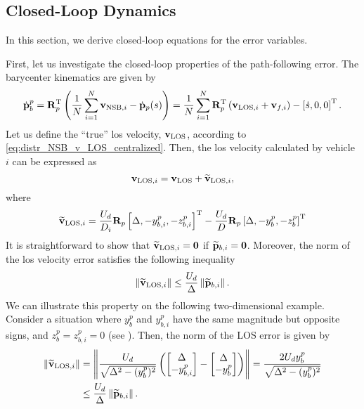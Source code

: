 \subsection{Closed-Loop Dynamics}
In this section, we derive closed-loop equations for the error variables.

First, let us investigate the closed-loop properties of the path-following error.
The barycenter kinematics are given by
\begin{equation}
        \dot{\mathbf{p}}_b^p = \mathbf{R}_p^{\mathrm{T}} \left(\frac{1}{N}\sum_{i=1}^N \mathbf{v}_{{\rm NSB}, i} - \dot{\mathbf{p}}_p(s)\right)
        = \frac{1}{N}\sum_{i=1}^N\mathbf{R}_p^{\mathrm{T}} \left(\mathbf{v}_{{\rm LOS}, i} + \mathbf{v}_{f, i}\right) - \left[\dot{s}, 0, 0\right]^{\mathrm{T}}.
    \label{eq:distr_NSB_p_b_CL_1}
\end{equation}
Let us define the ``true'' \gls{los} velocity, $\mathbf{v}_{\rm LOS}$, according to \eqref{eq:distr_NSB_v_LOS_centralized}.
Then, the \gls{los} velocity calculated by vehicle $i$ can be expressed as
\begin{equation}
    \mathbf{v}_{{\rm LOS}, i} = \mathbf{v}_{\rm LOS} + \widetilde{\mathbf{v}}_{{\rm LOS}, i}, \label{eq:distr_NSB_v_LOS_CL}
\end{equation}
where
\begin{equation}
    \widetilde{\mathbf{v}}_{{\rm LOS}, i} = \frac{U_d}{D_i} \mathbf{R}_p \left[\Delta, -y_{b, i}^p, -z_{b, i}^p\right]^{\mathrm{T}} - \frac{U_d}{D} \mathbf{R}_p \left[\Delta, -y_{b}^p, -z_{b}^p\right]^{\mathrm{T}}
\end{equation}
It is straightforward to show that $\widetilde{\mathbf{v}}_{{\rm LOS}, i} = \mathbf{0}$ if $\widetilde{\mathbf{p}}_{b, i} = \mathbf{0}$.
Moreover, the norm of the \gls{los} velocity error satisfies the following inequality
\begin{equation}
    \left\|\widetilde{\mathbf{v}}_{{\rm LOS}, i}\right\| \leq \frac{U_d}{\Delta} \left\|\widetilde{\mathbf{p}}_{b, i}\right\|.
    \label{eq:distr_NSB_v_LOS_tilde}
\end{equation}
We can illustrate this property on the following two-dimensional example.
Consider a situation where $y_b^p$ and $y_{b,i}^p$ have the same magnitude but opposite signs, and $z_b^p = z_{b,i}^p = 0$ (see ).
Then, the norm of the LOS error is given by
\begin{equation}
    \begin{split}
        \left\|\widetilde{\mathbf{v}}_{{\rm LOS}, i}\right\| &= \left\|\frac{U_d}{\sqrt{\Delta^2 - (y_b^p)^2}}\left(\begin{bmatrix} \Delta \\ -y_{b,i}^p \end{bmatrix} - \begin{bmatrix} \Delta \\ -y_b^p \end{bmatrix}\right)\right\| = \frac{2 U_d y_b^p}{\sqrt{\Delta^2 - (y_b^p)^2}} \\
        &\leq \frac{U_d}{\Delta} \left\|\widetilde{\mathbf{p}}_{b, i}\right\|.
    \end{split}
\end{equation}
